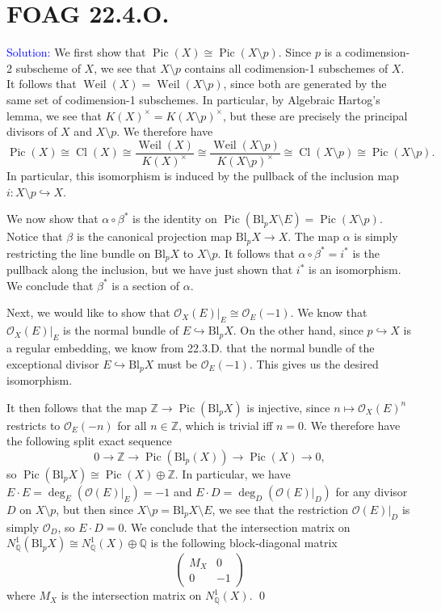 \documentclass[11pt]{article}
\newcommand{\QQ}{\mathbb{Q}}
\newcommand{\ZZ}{\mathbb{Z}}
\newcommand{\cO}{\mathcal{O}}
\newcommand{\Bl}{\mathrm{Bl}}
\newcommand{\Pic}{\operatorname{Pic}}
\newcommand{\Weil}{\operatorname{Weil}}
\newcommand{\Cl}{\operatorname{Cl}}
\newenvironment{solution}{\begin{trivlist}\item[]{\textcolor{blue}{Solution:}}}{\qed \end{trivlist}}
\begin{document}
\newpage

\section*{FOAG 22.4.O.}

\begin{solution}
    We first show that $\Pic(X) \cong \Pic(X \setminus p)$. Since $p$ is a codimension-2 subscheme of $X$, we see that $X \setminus p$ contains all codimension-1 subschemes of $X$. It follows that $\Weil (X) = \Weil (X \setminus p)$, since both are generated by the same set of codimension-1 subschemes. In particular, by Algebraic Hartog's lemma, we see that $K(X)^{\times} = K(X \setminus p)^{\times}$, but these are precisely the principal divisors of $X$ and $X \setminus p$. We therefore have 
    \[
        \Pic (X) \cong \Cl (X) \cong \frac{\Weil (X)}{K(X)^{\times}}
        \cong \frac{\Weil (X \setminus p)}{K(X \setminus p)^{\times}}
        \cong \Cl(X \setminus p) \cong \Pic (X \setminus p).
    \]
    In particular, this isomorphism is induced by the pullback of the inclusion map $i: X \setminus p \hookrightarrow X$. 

    We now show that $\alpha \circ \beta^*$ is the identity on $\Pic(\Bl_p X \setminus E) = \Pic(X \setminus p)$. Notice that $\beta$ is the canonical projection map $\Bl_p X \rightarrow X$. The map $\alpha$ is simply restricting the line bundle on $\Bl_p X$ to $X \setminus p$. It follows that $\alpha \circ \beta^* = i^*$ is the pullback along the inclusion, but we have just shown that $i^*$ is an isomorphism. We conclude that $\beta^*$ is a section of $\alpha$. 

    Next, we would like to show that $\cO_X(E)|_E \cong \cO_E(-1)$. We know that $\cO_X(E)|_E$ is the normal bundle of $E \hookrightarrow \Bl_p X$. On the other hand, since $p \hookrightarrow X$ is a regular embedding, we know from 22.3.D. that the normal bundle of the exceptional divisor $E \hookrightarrow \Bl_p X$ must be $\cO_E(-1)$. This gives us the desired isomorphism. 

    It then follows that the map $\ZZ \rightarrow \Pic(\Bl_p X)$ is injective, since $n \mapsto \cO_X(E)^n$ restricts to $\cO_E(-n)$ for all $n \in \ZZ$, which is trivial iff $n = 0$. We therefore have the following split exact sequence
    \[
        0 \longrightarrow \ZZ \longrightarrow \Pic (\Bl_p(X)) \longrightarrow \Pic (X) \longrightarrow 0,
    \]
    so $\Pic (\Bl_p X) \cong \Pic(X) \oplus \ZZ$. In particular, we have $E \cdot E = \deg_E(\cO(E)|_E) = -1$ and $E \cdot D = \deg_{D}(\cO(E)|_D)$ for any divisor $D$ on $X \setminus p$, but then since $X \setminus p = \Bl_p X \setminus E$, we see that the restriction $\cO(E)|_D$ is simply $\cO_D$, so $E \cdot D = 0$. We conclude that the intersection matrix on $N_{\QQ}^1(\Bl_p X) \cong N_{\QQ}^1 (X) \oplus \QQ$ is the following block-diagonal matrix 
    \[
        \begin{pmatrix}
            M_X & 0 \\ 0 & -1
        \end{pmatrix}
    \]
    where $M_X$ is the intersection matrix on $N_{\QQ}^1(X)$. 
\end{solution}
\end{document}
